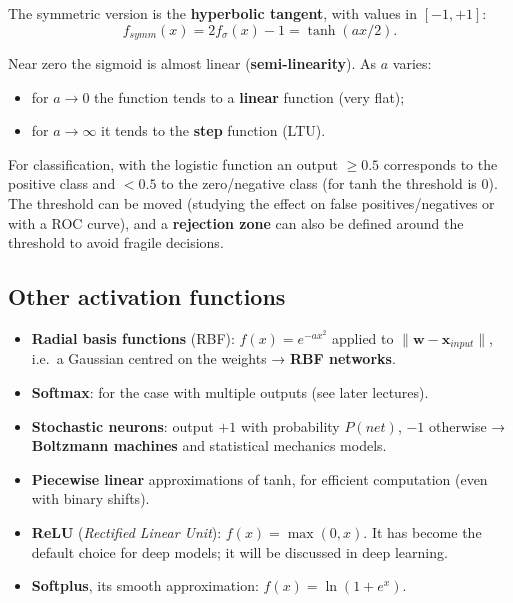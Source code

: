 The symmetric version is the \textbf{hyperbolic tangent}, with values
in \([-1, +1]\): \[
f_{symm}(x) = 2f_\sigma(x) - 1 = \tanh(ax/2).
\]

Near zero the sigmoid is almost linear (\textbf{semi-linearity}). As
\(a\) varies:

\begin{itemize}
\tightlist
\item
  for \(a \to 0\) the function tends to a \textbf{linear} function
  (very flat);
\item
  for \(a \to \infty\) it tends to the \textbf{step} function (LTU).
\end{itemize}

For classification, with the logistic function an output \(\ge 0.5\)
corresponds to the positive class and \(< 0.5\) to the zero/negative
class (for tanh the threshold is 0). The threshold can be moved
(studying the effect on false positives/negatives or with a ROC curve),
and a \textbf{rejection zone} can also be defined around the threshold
to avoid fragile decisions.

\subsection{Other activation
functions}\label{altre-funzioni-di-attivazione}

\begin{itemize}
\tightlist
\item
  \textbf{Radial basis functions} (RBF): \(f(x) = e^{-ax^2}\) applied
  to \(\|\mathbf{w} - \mathbf{x}_{input}\|\), i.e.\ a Gaussian centred
  on the weights → \textbf{RBF networks}.
\item
  \textbf{Softmax}: for the case with multiple outputs (see later
  lectures).
\item
  \textbf{Stochastic neurons}: output \(+1\) with probability
  \(P(net)\), \(-1\) otherwise → \textbf{Boltzmann machines} and
  statistical mechanics models.
\item
  \textbf{Piecewise linear} approximations of tanh, for efficient
  computation (even with binary shifts).
\item
  \textbf{ReLU} (\emph{Rectified Linear Unit}): \(f(x) = \max(0, x)\).
  It has become the default choice for deep models; it will be
  discussed in deep learning.
\item
  \textbf{Softplus}, its smooth approximation:
  \(f(x) = \ln(1 + e^x)\).
\end{itemize}

